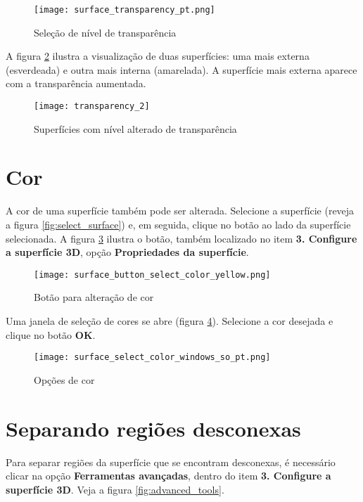 \begin{figure}[!htb]
\centering
\texttt{[image: surface\_transparency\_pt.png]}
\caption{Seleção de nível de transparência}
\label{fig:select_transparency}
\end{figure}

A figura \ref{fig:model_transparency} ilustra a visualização de duas superfícies: uma mais externa
(esverdeada) e outra mais interna (amarelada). A superfície mais externa aparece com a transparência
aumentada.

\begin{figure}[!htb]
\centering
\texttt{[image: transparency\_2]}
\caption{Superfícies com nível alterado de transparência}
\label{fig:model_transparency}
\end{figure}

\newpage

\section{Cor}

A cor de uma superfície também pode ser alterada. Selecione a superfície (reveja a figura
\ref{fig:select_surface}) e, em seguida, clique no botão ao lado da superfície selecionada. A figura
\ref{fig:change_surface_color} ilustra o botão, também localizado no item \textbf{3. Configure a
superfície 3D}, opção \textbf{Propriedades da superfície}.

\begin{figure}[!htb]
\centering
\texttt{[image: surface\_button\_select\_color\_yellow.png]}
\caption{Botão para alteração de cor}
\label{fig:change_surface_color}
\end{figure}

Uma janela de seleção de cores se abre (figura \ref{fig:button_select_color}). Selecione a cor
desejada e clique no botão \textbf{OK}.

\begin{figure}[!htb]
\centering
\texttt{[image: surface\_select\_color\_windows\_so\_pt.png]}
\caption{Opções de cor}
\label{fig:button_select_color}
\end{figure}

\section{Separando regiões desconexas}

Para separar regiões da superfície que se encontram desconexas, é necessário clicar na opção
\textbf{Ferramentas avançadas}, dentro do item \textbf{3. Configure a superfície 3D}. Veja a
figura \ref{fig:advanced_tools}.

